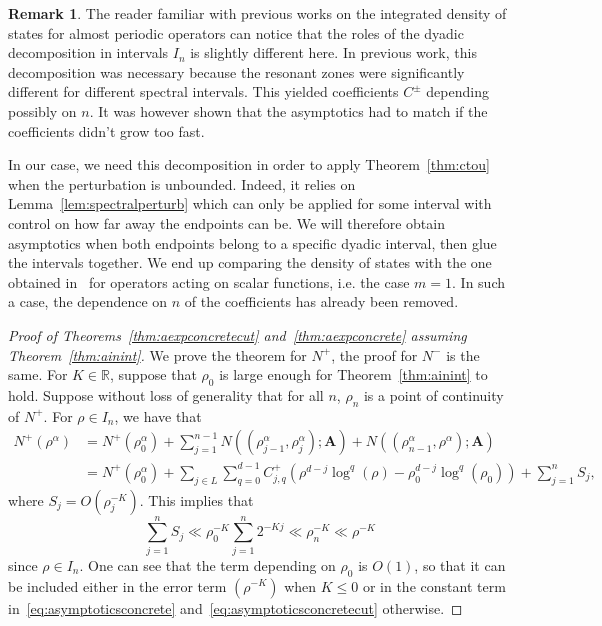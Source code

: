 \documentclass[10pt]{amsart}
\theoremstyle{definition}\newtheorem{defi}[theo]{Definition}\newtheorem{rema}[theo]{Remark}\newtheorem{exam}[theo]{Example}\newtheorem{nota}[theo]{Notation}
\newcommand{\R}{\mathbb R}
\newcommand{\BA}{\mathbf A}
\newcommand{\bigo}[1]{O\left(#1 \right)}
\begin{document}
\begin{rema}
The reader familiar with previous works on the integrated density of states for almost periodic operators can notice that the roles of the dyadic decomposition in intervals $I_n$ is slightly different here. In previous work, this decomposition was necessary because the resonant zones were significantly different for different spectral intervals. This yielded coefficients $C^\pm$ depending possibly on $n$. It was however shown that the asymptotics had to match if the coefficients didn't grow too fast.

In our case, we need this decomposition in order to apply Theorem~\ref{thm:ctou} when the perturbation is unbounded. Indeed, it relies on Lemma~\ref{lem:spectralperturb} which can only be applied for some interval with control on how far away the endpoints can be. We will therefore obtain asymptotics when both endpoints belong to a specific dyadic interval, then glue the intervals together. We end up comparing the density of states with the one obtained in~\cite{MorParSht2014} for operators acting on scalar functions, i.e. the case $m = 1$. In such a case, the dependence on $n$ of the coefficients has already been removed.
\end{rema}

\begin{proof}[Proof of Theorems~\ref{thm:aexpconcretecut} and~\ref{thm:aexpconcrete} assuming Theorem~\ref{thm:ainint}] We prove the theorem for $N^+$, the proof for $N^-$ is the same. For $K \in \R$, suppose that $\rho_0$ is large enough for Theorem~\ref{thm:ainint} to hold. Suppose without loss of generality that for all $n$, $\rho_n$ is a point of continuity of $N^+$. For $\rho \in I_n$, we have that
\begin{equation}\label{eq:foldingsum}
\begin{aligned}
N^+(\rho^\alpha) &= N^+(\rho_0^\alpha) + \sum_{j=1}^{n-1} N((\rho_{j-1}^\alpha, \rho_j^\alpha);\BA) + N((\rho_{n-1}^\alpha,\rho^\alpha);\BA) \\
&= N^+(\rho_0^\alpha) +
\sum_{j\in L} \sum_{q =0}^{d-1} C_{j,q}^+
\left(\rho^{d-j} \log^q(\rho) - \rho_0^{d-j} \log^q(\rho_0)\right) +
\sum_{j=1}^n S_j,
\end{aligned}
\end{equation}
where $S_j = \bigo{\rho_j^{-K}}$. This implies that
\begin{equation}\label{eq:glued}
\sum_{j=1}^n S_j \ll \rho_0^{-K} \sum_{j = 1}^n 2^{-Kj} \ll \rho_n^{-K} \ll \rho^{-K}
\end{equation}
since $\rho \in I_n$. One can see that the term depending on $\rho_0$ is $\bigo{1}$, so that it can be included either in the error term $(\rho^{-K})$ when $K \le 0$ or in the constant term in~\eqref{eq:asymptoticsconcrete} and~\eqref{eq:asymptoticsconcretecut} otherwise.
\end{proof}
\end{document}

